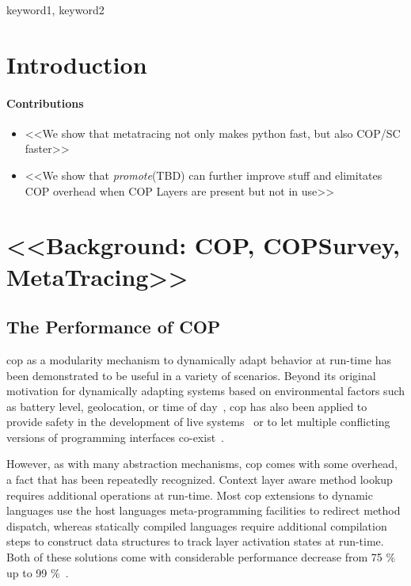\documentclass[preprint,english,10pt,nonatbib]{sigplanconf}
\begin{document}

\keywords
keyword1, keyword2

\section{Introduction}

\paragraph*{Contributions}

\begin{itemize}
\item <<We show that metatracing not only makes python fast, but also COP/SC
  faster>>
\item <<We show that \emph{promote}(TBD) can further improve stuff and
  elimitates COP overhead when COP Layers are present but not in use>>
\end{itemize}

\section{<<Background: COP, COPSurvey, MetaTracing>>}

\subsection{The Performance of COP}
\label{sec:performance-cop}
\ac{cop} as a modularity mechanism to dynamically adapt behavior at run-time has
been demonstrated to be useful in a variety of scenarios. Beyond its original
motivation for dynamically adapting systems based on environmental factors such
as battery level, geolocation, or time of day~, \ac{cop} has also
been applied to provide safety in the development of live
systems~\cite{lincke+:2012:scoping-changes} or to let multiple conflicting
versions of programming interfaces co-exist~. 

However, as with many abstraction mechanisms, \ac{cop} comes with some overhead,
a fact that has been repeatedly recognized. Context layer aware method lookup
requires additional operations at run-time. Most \ac{cop} extensions to dynamic
languages use the host languages meta-programming facilities to redirect method
dispatch, whereas statically compiled languages require additional compilation
steps to construct data structures to track layer activation states at
run-time. Both of these solutions come with considerable performance decrease
from 75 \% up to 99 \%~\cite{appeltauer+:2009:comparison-context-oriented}.
\end{document}
